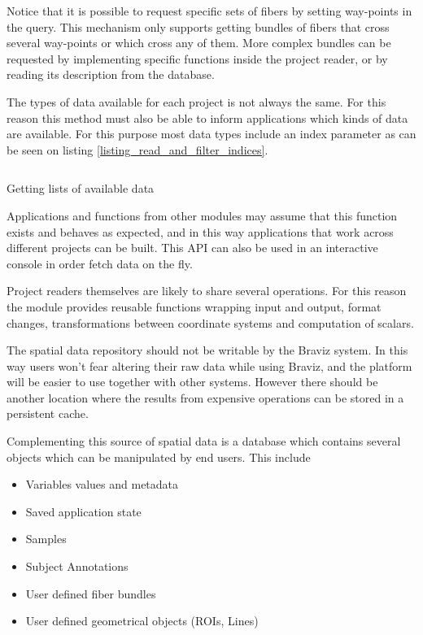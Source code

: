 Notice that it is possible to request specific sets of fibers by setting way-points in the query. This mechanism only supports getting bundles of fibers that cross several way-points or which cross any of them. More complex bundles can be requested by implementing specific functions inside the project reader, or by reading its description from the database.

The types of data available for each project is not always the same. For this reason this method must also be able to inform applications which kinds of data are available. For this purpose most data types include an index parameter as can be seen on listing \ref{listing_read_and_filter_indices}.

\begin{listing}
\inputminted{python}{code/read_and_filter_indices.py}
\caption{Getting lists of available data}
\label{listing_read_and_filter_indices}
\end{listing}

Applications and functions from other modules may assume that this function exists and behaves as expected, and in this way applications that work across different projects can be built. This API can also be used in an interactive console in order fetch data on the fly.

Project readers themselves are likely to share several operations. For this reason the module provides reusable functions wrapping input and output, format changes, transformations between coordinate systems and computation of scalars.

The spatial data repository should not be writable by the Braviz system. In this way users won't fear altering their raw data while using Braviz, and the platform will be easier to use together with other systems. However there should be another location where the results from expensive operations can be stored in a persistent cache.

Complementing this source of spatial data is a database which contains several objects which can be manipulated by end users. This include

\begin{itemize}
\item Variables values and metadata
\item Saved application state
\item Samples
\item Subject Annotations
\item User defined fiber bundles
\item User defined geometrical objects (ROIs, Lines)
\end{itemize}

